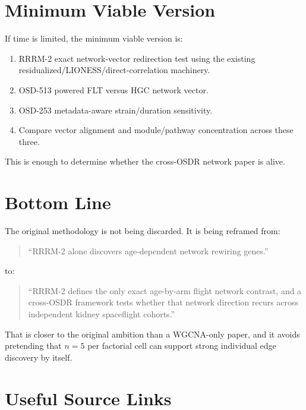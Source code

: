 \documentclass[11pt]{article}
\begin{document}
\section{Minimum Viable Version}

If time is limited, the minimum viable version is:

\begin{enumerate}
  \item RRRM-2 exact network-vector redirection test using the existing
        residualized/LIONESS/direct-correlation machinery.
  \item OSD-513 powered FLT versus HGC network vector.
  \item OSD-253 metadata-aware strain/duration sensitivity.
  \item Compare vector alignment and module/pathway concentration across these
        three.
\end{enumerate}

This is enough to determine whether the cross-OSDR network paper is alive.

\section{Bottom Line}

The original methodology is not being discarded. It is being reframed from:

\begin{quote}
``RRRM-2 alone discovers age-dependent network rewiring genes.''
\end{quote}

to:

\begin{quote}
``RRRM-2 defines the only exact age-by-arm flight network contrast, and a
cross-OSDR framework tests whether that network direction recurs across
independent kidney spaceflight cohorts.''
\end{quote}

That is closer to the original ambition than a WGCNA-only paper, and it avoids
pretending that $n=5$ per factorial cell can support strong individual edge
discovery by itself.

\section*{Useful Source Links}
\end{document}
